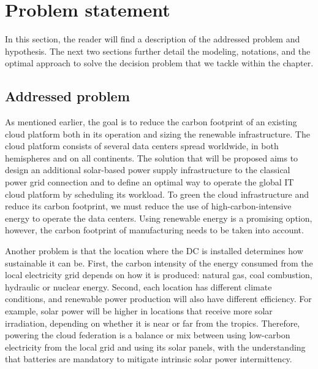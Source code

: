 \section{Problem statement}
\label{sec:problemStatement_ccgrid}

In this section, the reader will find a description of the addressed problem and hypothesis. The next two sections further detail the modeling, notations, and the optimal approach to solve the decision problem that we tackle within the chapter. 

\subsection{Addressed problem}
\label{sec:addressedproblem_ccgrid}

As mentioned earlier, the goal is to reduce the carbon footprint of an existing cloud platform both in its operation and sizing the renewable infrastructure. The cloud platform consists of several data centers spread worldwide, in both hemispheres and on all continents. The solution that will be proposed aims to design an additional solar-based power supply infrastructure to the classical power grid connection and to define an optimal way to operate the global IT cloud platform by scheduling its workload. To green the cloud infrastructure and reduce its carbon footprint, we must reduce the use of high-carbon-intensive energy to operate the data centers. Using renewable energy is a promising option, however, the carbon footprint of manufacturing needs to be taken into account.

Another problem is that the location where the DC is installed determines how sustainable it can be. First, the carbon intensity of the energy consumed from the local electricity grid depends on how it is produced: natural gas, coal combustion, hydraulic or nuclear energy. Second, each location has different climate conditions, and renewable power production will also have different efficiency. For example, solar power will be higher in locations that receive more solar irradiation, depending on whether it is near or far from the tropics. Therefore, powering the cloud federation is a balance or mix between using low-carbon electricity from the local grid and using its solar panels, with the understanding that batteries are mandatory to mitigate intrinsic solar power intermittency. 

